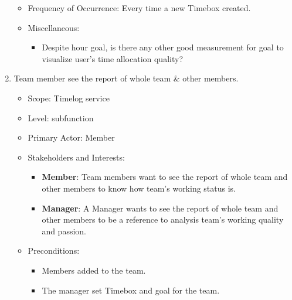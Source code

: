 \documentclass[12pt, a4paper]{article}
\begin{document}
\begin{CJK*}{UTF8}{bkai}
\begin{enumerate}
\begin{itemize}
          \item Frequency of Occurrence: Every time a new Timebox created.
          \item Miscellaneous:
            \begin{itemize}
              \item Despite hour goal, is there any other good measurement for goal to visualize user's time allocation quality?
            \end{itemize}
        \end{itemize}
      \item Team member see the report of whole team \& other members.
        \begin{itemize}
          \item Scope: Timelog service
          \item Level: subfunction
          \item Primary Actor: Member
          \item Stakeholders and Interests:
            \begin{itemize}
              \item {\bf Member}: Team members want to see the report of whole team and other members to know how team's working status is.
              \item {\bf Manager}: A Manager wants to see the report of whole team and other members to be a reference to analysis team's working quality and passion.
            \end{itemize}
          \item Preconditions:
            \begin{itemize}
              \item Members added to the team.
              \item The manager set Timebox and goal for the team.
            \end{itemize}


\end{itemize}
\end{enumerate}
\end{CJK*}
\end{document}
